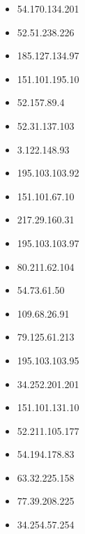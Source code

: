 \documentclass{article}
\begin{document}
\begin{itemize}
        \item 54.170.134.201
    
        \item 52.51.238.226
    
        \item 185.127.134.97
    
        \item 151.101.195.10
    
        \item 52.157.89.4
    
        \item 52.31.137.103
    
        \item 3.122.148.93
    
        \item 195.103.103.92
    
        \item 151.101.67.10
    
        \item 217.29.160.31
    
        \item 195.103.103.97
    
        \item 80.211.62.104
    
        \item 54.73.61.50
    
        \item 109.68.26.91
    
        \item 79.125.61.213
    
        \item 195.103.103.95
    
        \item 34.252.201.201
    
        \item 151.101.131.10
    
        \item 52.211.105.177
    
        \item 54.194.178.83
    
        \item 63.32.225.158
    
        \item 77.39.208.225
    
        \item 34.254.57.254
    

\end{itemize}
\end{document}
